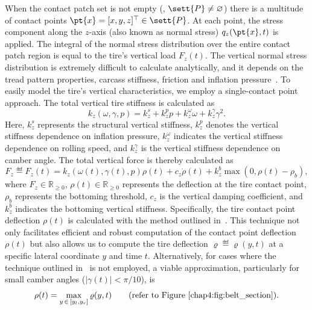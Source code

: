 When the contact patch set is not empty (\ie{}, $\sett{P} \neq \varnothing$) there is a multitude of contact points $\pt{x} = [x,y,z]^\top \in \sett{P}$. At each point, the stress component along the $z$-axis (also known as normal stress) $q_z(\pt{x},t)$ is applied. The integral of the normal stress distribution over the entire contact patch region is equal to the tire's vertical load $F_z(t)$. The vertical normal stress distribution is extremely difficult to calculate analytically, and it depends on the tread pattern properties, carcass stiffness, friction and inflation pressure~\cite{nakajima2019advanced}. To easily model the tire's vertical characteristics, we employ a single-contact point approach. The total vertical tire stiffness is calculated as
%
\begin{equation}
  k_z(\omega, \gamma, p) = k_z^s + k_z^p p + k_z^\omega \omega + k_z^\gamma \gamma^2.
\end{equation}
%
Here, $k_z^s$ represents the structural vertical stiffness, $k_z^p$ denotes the vertical stiffness dependence on inflation pressure, $k_z^\omega$ indicates the vertical stiffness dependence on rolling speed, and $k_z^\gamma$ is the vertical stiffness dependence on camber angle. The total vertical force is thereby calculated as
%
\begin{equation}
  F_z \eqdef F_z(t) = k_z(\omega(t), \gamma(t), p) \rho(t) + c_z \dot{\rho}(t) + k_z^b \max(0, \rho(t)-\rho_b),
  \label{chap4:eq:vertical_force}
\end{equation}
%
where $F_z \in \mathbb{R}_{\geq 0}$, $\rho(t) \in \mathbb{R}_{\geq 0}$ represents the deflection at the tire contact point, $\rho_b$ represents the bottoming threshold, $c_z$ is the vertical damping coefficient, and $k_z^b$ indicates the bottoming vertical stiffness. Specifically, the tire contact point deflection $\rho(t)$ is calculated with the method outlined in~\cite{stocco2024novel, stocco2021acme}. This technique not only facilitates efficient and robust computation of the contact point deflection $\rho(t)$ but also allows us to compute the tire deflection $\varrho \eqdef \varrho(y,t)$ at a specific lateral coordinate $y$ and time $t$. Alternatively, for cases where the technique outlined in~\cite{stocco2024novel} is not employed, a viable approximation, particularly for small camber angles ($|\gamma(t)| < \pi/10$), is
%
\begin{equation}
  \rho(t) = \max_{y \, \in \, [y_l, y_r]} \varrho(y,t) \qquad \text{(refer to \figurename~\ref{chap4:fig:belt_section})}.
\end{equation}

